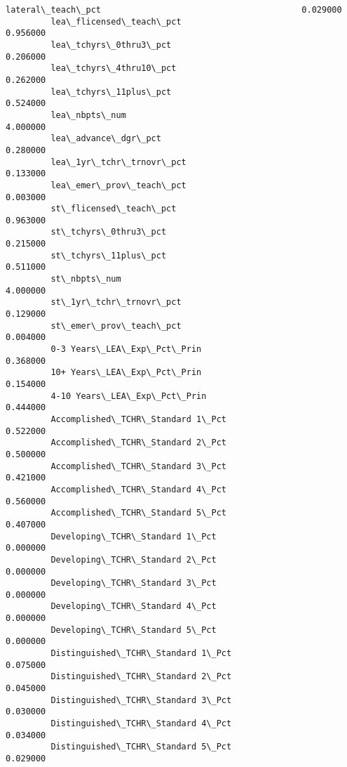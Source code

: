 \documentclass[11pt]{article}
\begin{document}
\begin{Verbatim}[commandchars=\\\{\}]
         lateral\_teach\_pct                                        0.029000   
         lea\_flicensed\_teach\_pct                                  0.956000   
         lea\_tchyrs\_0thru3\_pct                                    0.206000   
         lea\_tchyrs\_4thru10\_pct                                   0.262000   
         lea\_tchyrs\_11plus\_pct                                    0.524000   
         lea\_nbpts\_num                                            4.000000   
         lea\_advance\_dgr\_pct                                      0.280000   
         lea\_1yr\_tchr\_trnovr\_pct                                  0.133000   
         lea\_emer\_prov\_teach\_pct                                  0.003000   
         st\_flicensed\_teach\_pct                                   0.963000   
         st\_tchyrs\_0thru3\_pct                                     0.215000   
         st\_tchyrs\_11plus\_pct                                     0.511000   
         st\_nbpts\_num                                             4.000000   
         st\_1yr\_tchr\_trnovr\_pct                                   0.129000   
         st\_emer\_prov\_teach\_pct                                   0.004000   
         0-3 Years\_LEA\_Exp\_Pct\_Prin                               0.368000   
         10+ Years\_LEA\_Exp\_Pct\_Prin                               0.154000   
         4-10 Years\_LEA\_Exp\_Pct\_Prin                              0.444000   
         Accomplished\_TCHR\_Standard 1\_Pct                         0.522000   
         Accomplished\_TCHR\_Standard 2\_Pct                         0.500000   
         Accomplished\_TCHR\_Standard 3\_Pct                         0.421000   
         Accomplished\_TCHR\_Standard 4\_Pct                         0.560000   
         Accomplished\_TCHR\_Standard 5\_Pct                         0.407000   
         Developing\_TCHR\_Standard 1\_Pct                           0.000000   
         Developing\_TCHR\_Standard 2\_Pct                           0.000000   
         Developing\_TCHR\_Standard 3\_Pct                           0.000000   
         Developing\_TCHR\_Standard 4\_Pct                           0.000000   
         Developing\_TCHR\_Standard 5\_Pct                           0.000000   
         Distinguished\_TCHR\_Standard 1\_Pct                        0.075000   
         Distinguished\_TCHR\_Standard 2\_Pct                        0.045000   
         Distinguished\_TCHR\_Standard 3\_Pct                        0.030000   
         Distinguished\_TCHR\_Standard 4\_Pct                        0.034000   
         Distinguished\_TCHR\_Standard 5\_Pct                        0.029000   

\end{Verbatim}
\end{document}
